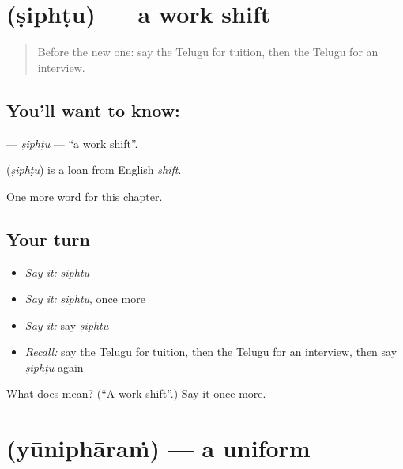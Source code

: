 \section[\texorpdfstring{\te{షిఫ్టు} (ṣiphṭu)}{షిఫ్టు (ṣiphṭu)}]{ (ṣiphṭu) — a work shift}

\label{lesson:TE-C198-siphtu}



\begin{quote}
Before the new one: say the Telugu for tuition, then the Telugu for an interview.
\end{quote}

\subsection*{You'll want to know: }
\textbf{} — \emph{ṣiphṭu} — \textquotedblleft{}a work shift\textquotedblright{}.

\begin{cousinweb}
\textbf{} (\emph{ṣiphṭu}) is a loan from English \emph{shift}.
\end{cousinweb}

\begin{grammarlens}[title={What you've built}]
One more word for this chapter.
\end{grammarlens}

\subsection*{Your turn}
\begin{itemize}
\raggedright
  \item \emph{Say it:} \emph{ṣiphṭu}
  \item \emph{Say it:} \emph{ṣiphṭu}, once more
  \item \emph{Say it:} say \emph{ṣiphṭu}
  \item \emph{Recall:} say the Telugu for tuition, then the Telugu for an interview, then say \emph{ṣiphṭu} again
\end{itemize}

\begin{tcolorbox}[breakable,colback=teal!4,colframe=teal!35!black,title={Before you move on}]
What does  mean? (\textquotedblleft{}A work shift\textquotedblright{}.) Say it once more.
\end{tcolorbox}
\section[\texorpdfstring{\te{యూనిఫారం} (yūniphāraṁ)}{యూనిఫారం (yūniphāraṁ)}]{ (yūniphāraṁ) — a uniform}

